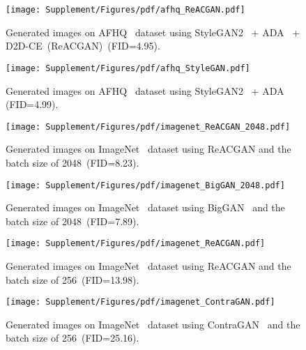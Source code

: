 \documentclass{article}
\begin{document}
\begin{figure}[h!]
    \centering
    \texttt{[image: Supplement/Figures/pdf/afhq\_ReACGAN.pdf]}
    \hspace{-0.25cm}
    \caption{Generated images on AFHQ~\cite{choi2020starganv2} dataset using StyleGAN2~\cite{karras2020analyzing} +  ADA~\cite{Karras2020TrainingGA} + D2D-CE~(ReACGAN)~(FID=4.95).}
    \label{fig:Figure_qualitative_big_afhq}
\end{figure} \begin{figure}[ht]
    \centering
    \texttt{[image: Supplement/Figures/pdf/afhq\_StyleGAN.pdf]}
    \hspace{-0.25cm}
    \caption{Generated images on AFHQ~\cite{choi2020starganv2} dataset using StyleGAN2~\cite{karras2020analyzing} + ADA~\cite{Karras2020TrainingGA} (FID=4.99).} 
    \label{fig:Figure_qualitative_reac_afhq}
\end{figure}  \begin{figure}[ht]
    \centering
    \texttt{[image: Supplement/Figures/pdf/imagenet\_ReACGAN\_2048.pdf]}
    \hspace{-0.25cm}
    \caption{Generated images on ImageNet~\cite{Deng2009ImageNetAL} dataset using ReACGAN and the batch size of 2048~(FID=8.23).} 
    \label{fig:Figure_qualitative_reac_img2048}
\end{figure} \begin{figure}[ht]
    \centering
    \texttt{[image: Supplement/Figures/pdf/imagenet\_BigGAN\_2048.pdf]}
    \hspace{-0.25cm}
    \caption{Generated images on ImageNet~\cite{Deng2009ImageNetAL} dataset using BigGAN~\cite{Brock2019LargeSG} and the batch size of 2048~(FID=7.89).} 
    \label{fig:Figure_qualitative_big_img2048}
\end{figure} 

\begin{figure}[ht]
    \centering
    \texttt{[image: Supplement/Figures/pdf/imagenet\_ReACGAN.pdf]}
    \hspace{-0.25cm}
    \caption{Generated images on ImageNet~\cite{Deng2009ImageNetAL} dataset using ReACGAN and the batch size of 256~(FID=13.98).} 
    \label{fig:Figure_qualitative_reac_img256}
\end{figure} 

\begin{figure}[ht]
    \centering
    \texttt{[image: Supplement/Figures/pdf/imagenet\_ContraGAN.pdf]}
    \hspace{-0.25cm}
    \caption{Generated images on ImageNet~\cite{Deng2009ImageNetAL} dataset using ContraGAN~\cite{kang2020contragan} and the batch size of 256~(FID=25.16).} 
    \label{fig:Figure_qualitative_contra_img}
\end{figure} 
\end{document}
